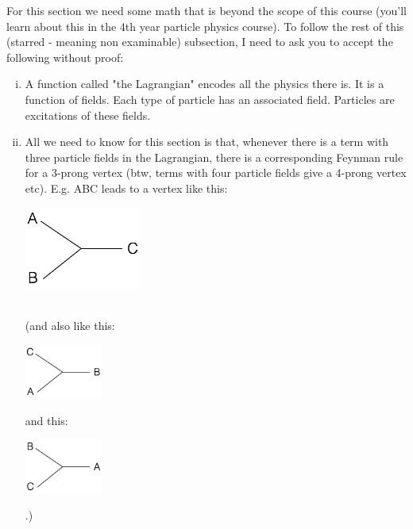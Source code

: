 For this section we need some math that is beyond the scope of this course (you'll learn about this in the 4th year particle physics course). To follow the rest of this (starred - meaning non examinable) subsection, I need to ask you to accept the following without proof:
\begin{enumerate}[i)]
\item A function called "the Lagrangian" encodes all the physics there is. It is a function of fields. Each type of particle has an associated field. Particles are excitations of these fields.
\item All we need to know for this section is that, whenever there is a term with three particle fields in the Lagrangian, there is a corresponding Feynman rule for a 3-prong vertex (btw, terms with four particle fields give a 4-prong vertex etc). E.g. ABC leads to a vertex like this:
\\
\parbox[c]{0.3\textwidth}{\includegraphics[width=0.3\textwidth]{fig/C_P_CP/ABC_vtx}}
\\
(and also like this:
\parbox[c]{0.2\textwidth}{\includegraphics[width=0.2\textwidth]{fig/C_P_CP/CAB_vtx}}
and this:
\parbox[c]{0.2\textwidth}{\includegraphics[width=0.2\textwidth]{fig/C_P_CP/BCA_vtx}}.)
\end{enumerate}

